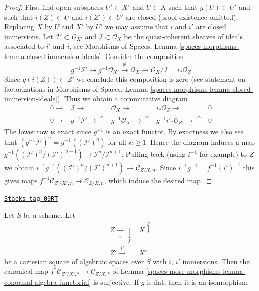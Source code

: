 \begin{proof}
First find open subspaces $U' \subset X'$ and $U \subset X$ such that
$g(U) \subset U'$ and such that $i(Z) \subset U$ and $i(Z') \subset U'$
are closed (proof existence omitted). Replacing $X$ by $U$ and $X'$ by
$U'$ we may assume that $i$ and $i'$ are closed immersions.
Let $\mathcal{I}' \subset \mathcal{O}_{X'}$ and
$\mathcal{I} \subset \mathcal{O}_X$ be the quasi-coherent sheaves of
ideals associated to $i'$ and $i$, see
Morphisms of Spaces, Lemma \ref{spaces-morphisms-lemma-closed-immersion-ideals}.
Consider the composition
$$
g^{-1}\mathcal{I}' \to g^{-1}\mathcal{O}_{X'}
\xrightarrow{g^\sharp} \mathcal{O}_X \to
\mathcal{O}_X/\mathcal{I} = i_*\mathcal{O}_Z
$$
Since $g(i(Z)) \subset Z'$ we conclude this composition is zero (see
statement on factorizations in
Morphisms of Spaces,
Lemma \ref{spaces-morphisms-lemma-closed-immersion-ideals}).
Thus we obtain a commutative diagram
$$
\begin{array}{ccccc}0 \longrightarrow & \mathcal{I} \longrightarrow & \mathcal{O}_X \longrightarrow & i_*\mathcal{O}_Z \longrightarrow & 0 \\ 0 \longrightarrow & g^{-1}\mathcal{I}' \longrightarrow\uparrow & g^{-1}\mathcal{O}_{X'} \longrightarrow\uparrow & g^{-1}i'_*\mathcal{O}_{Z'} \longrightarrow\uparrow & 0\end{array}
$$
The lower row is exact since $g^{-1}$ is an exact functor.
By exactness we also see that
$(g^{-1}\mathcal{I}')^n = g^{-1}((\mathcal{I}')^n)$ for all $n \geq 1$.
Hence the diagram induces a map
$g^{-1}((\mathcal{I}')^n/(\mathcal{I}')^{n + 1}) \to
\mathcal{I}^n/\mathcal{I}^{n + 1}$.
Pulling back (using $i^{-1}$ for example) to $Z$ we obtain
$i^{-1}g^{-1}((\mathcal{I}')^n/(\mathcal{I}')^{n + 1}) \to
\mathcal{C}_{Z/X, n}$.
Since $i^{-1}g^{-1} = f^{-1}(i')^{-1}$ this gives maps
$f^{-1}\mathcal{C}_{Z'/X', n} \to \mathcal{C}_{Z/X, n}$, which induce
the desired map.
\end{proof}

\begin{lemma}
\label{spaces-more-morphisms-lemma-conormal-algebra-functorial-flat}
\href{https://stacks.math.columbia.edu/tag/09RT}{\texttt{Stacks tag 09RT}}

Let $S$ be a scheme. Let
$$
\begin{array}{cc}Z \underset{i}{\longrightarrow}\underset{f}{\downarrow} & X \overset{g}{\downarrow} \\ Z' \overset{i'}{\longrightarrow} & X'\end{array}
$$
be a cartesian square of algebraic spaces over $S$ with
$i$, $i'$ immersions. Then the canonical map
$f^*\mathcal{C}_{Z'/X', *} \to \mathcal{C}_{Z/X, *}$ of
Lemma \ref{spaces-more-morphisms-lemma-conormal-algebra-functorial}
is surjective. If $g$ is flat, then it is an isomorphism.
\end{lemma}

